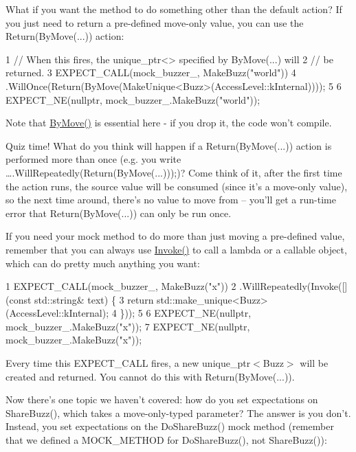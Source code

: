 What if you want the method to do something other than the default action? If you just need to return a pre-\/defined move-\/only value, you can use the {\ttfamily Return(By\+Move(...))} action\+:


\begin{DoxyCode}
1 // When this fires, the unique\_ptr<> specified by ByMove(...) will
2 // be returned.
3 EXPECT\_CALL(mock\_buzzer\_, MakeBuzz("world"))
4     .WillOnce(Return(ByMove(MakeUnique<Buzz>(AccessLevel::kInternal))));
5 
6 EXPECT\_NE(nullptr, mock\_buzzer\_.MakeBuzz("world"));
\end{DoxyCode}


Note that {\ttfamily \hyperlink{namespacetesting_acaa432211a3aec62e3d0f24b47bd2dae}{By\+Move()}} is essential here -\/ if you drop it, the code won’t compile.

Quiz time! What do you think will happen if a {\ttfamily Return(By\+Move(...))} action is performed more than once (e.\+g. you write {\ttfamily ….\+Will\+Repeatedly(Return(By\+Move(...)));})? Come think of it, after the first time the action runs, the source value will be consumed (since it’s a move-\/only value), so the next time around, there’s no value to move from -- you’ll get a run-\/time error that {\ttfamily Return(By\+Move(...))} can only be run once.

If you need your mock method to do more than just moving a pre-\/defined value, remember that you can always use {\ttfamily \hyperlink{namespacetesting_a12aebaf8363d49a383047529f798b694}{Invoke()}} to call a lambda or a callable object, which can do pretty much anything you want\+:


\begin{DoxyCode}
1 EXPECT\_CALL(mock\_buzzer\_, MakeBuzz("x"))
2     .WillRepeatedly(Invoke([](const std::string& text) \{
3       return std::make\_unique<Buzz>(AccessLevel::kInternal);
4     \}));
5 
6 EXPECT\_NE(nullptr, mock\_buzzer\_.MakeBuzz("x"));
7 EXPECT\_NE(nullptr, mock\_buzzer\_.MakeBuzz("x"));
\end{DoxyCode}


Every time this {\ttfamily E\+X\+P\+E\+C\+T\+\_\+\+C\+A\+LL} fires, a new {\ttfamily unique\+\_\+ptr$<$Buzz$>$} will be created and returned. You cannot do this with {\ttfamily Return(By\+Move(...))}.

Now there’s one topic we haven’t covered\+: how do you set expectations on {\ttfamily Share\+Buzz()}, which takes a move-\/only-\/typed parameter? The answer is you don’t. Instead, you set expectations on the {\ttfamily Do\+Share\+Buzz()} mock method (remember that we defined a {\ttfamily M\+O\+C\+K\+\_\+\+M\+E\+T\+H\+OD} for {\ttfamily Do\+Share\+Buzz()}, not {\ttfamily Share\+Buzz()})\+:


